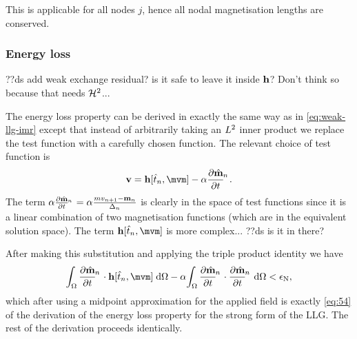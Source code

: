 This is applicable for all nodes $j$, hence all nodal magnetisation lengths are conserved.


\subsubsection{Energy loss}
??ds add weak exchange residual? is it safe to leave it inside $\mathbf{h}$? Don't think so because that needs $\mathcal{H}^2$...

The energy loss property can be derived in exactly the same way as in \autoref{eq:weak-llg-imr} except that instead of arbitrarily taking an $L^2$ inner product we replace the test function with a carefully chosen function.
The relevant choice of test function is
\begin{equation}
  \testv = \hv[\tm, \mvm] - \dampc \dmdtm.
\end{equation}
The term $\dampc \dmdtm = \dampc\frac{mv_{n+1} - \mv_n}{\dtn}$ is clearly in the space of test functions since it is a linear combination of two magnetisation functions (which are in the equivalent solution space).
The term $\hv[\tm, \mvm]$ is more complex... ??ds is it in there?

After making this substitution and applying the triple product identity we have
\begin{equation}
  \intd{\dmdtm \cdot \hv[\tm, \mvm]} - \dampc \intd{\dmdtm \cdot \dmdtm} < \ntol,
\end{equation}
which after using a midpoint approximation for the applied field is exactly \eqref{eq:54} of the derivation of the energy loss property for the strong form of the LLG.
The rest of the derivation proceeds identically.





